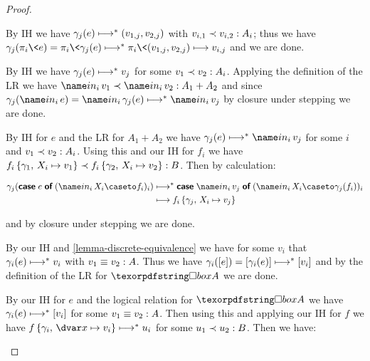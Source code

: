\begin{proof}
\begin{description}[ topsep=\baselineskip, itemsep=\baselineskip, ]
  \item[Case\quad $\infer{\J e \G {A_1 \x A_2}}{\J{\pi_i\<e}\G{A_i}}$.] By IH we have \(\gamma_j(e) \evalsto \etuple{v_{1,j}, v_{2,j}}\) with \(\oplrvalue{A_i}{v_{i,1}}{v_{i,2}}\); thus we have \(\gamma_j(\pi_i\<e) = \pi_i\<\gamma_j(e) \evalsto \pi_i\<\etuple{v_{1,j}, v_{2,j}} \stepsto v_{i,j}\) and we are done.

  \item[Case\quad $\infer{\J e \G A_i}{\J{\inj i e}\G{A_1 + A_2}}$.]
    By IH we have \(\gamma_j(e) \evalsto v_j\) for some \(\oplrvalue{A_i}{v_1}{v_2}\). Applying the definition of the LR we have \(\oplrvalue{A_1 + A_2}{\inj i v_1}{\inj i v_2}\) and since \(\gamma_j(\inj i e) = \inj i \gamma_j(e) \evalsto \inj i v_j\) by closure under stepping we are done.

  \item[Case\quad $\infer{\J e \G {A_1 + A_2} \\
      (\J {f_i} {\G,\, \hm{x_i}{A_i}} {B})_i
    }{
      \J {\emcase{e} (\inj i {\mvar x_i} \caseto f_i)_i} \G B
    }$.]
    By IH for $e$ and the LR for \(A_1 + A_2\) we have \(\gamma_j(e) \evalsto \inj i v_j\) for some $i$ and \(\oplrvalue{A_i}{v_1}{v_2}\). Using this and our IH for $f_i$ we have \(\oplrclosed B {\sub{f_i}{\gamma_1,\, \subto{\mvar x_i}{v_1}}}{\sub{f_i}{\gamma_2,\, \subto{\mvar x_i}{v_2}}}\). Then by calculation:

    \begin{align*}
      \gamma_j(\emcase{e} (\inj i {\mvar x_i} \caseto f_i)_i)
      &\evalsto
      {\emcase {\inj i v_j} (\inj i {\mvar x_i} \caseto \gamma_j(f_i))_i}
      \\
      &\stepsto
      \sub{f_i}{\gamma_j,\, \subto{\mvar x_i}{v_j}}
    \end{align*}

    \noindent
    and by closure under stepping we are done.

  \item[Case\quad $\infer{\J {e} {\stripcx\G} A}{\J{\ebox e} \G {\iso A}}$.]
    By our IH and \cref{lemma-discrete-equivalence} we have for some $v_i$ that \(\gamma_i(e) \evalsto v_i\) with \(\oplrvalueequiv A {v_1}{v_2}\). Thus we have \(\gamma_i(\eboxraw{e}) = \eboxraw{\gamma_i(e)} \evalsto \eboxraw{v_i}\) and by the definition of the LR for \(\iso A\) we are done.

  \item[Case\quad $\infer{\J e \G {\iso A} \\ \J f {\G,\,\hd x A} B}{
    \J {\eletbox x e f} \G B}$.]
    By our IH for $e$ and the logical relation for \(\iso A\) we have \(\gamma_i(e) \evalsto \eboxraw{v_i}\) for some \(\oplrvalueequiv A {v_1}{v_2}\). Then using this and applying our IH for $f$ we have \(\sub{f}{\gamma_i,\, \subto{\dvar x}{v_i}} \evalsto u_i\) for some \(\oplrvalue B {u_1}{u_2}\). Then we have:


\end{description}
\end{proof}
